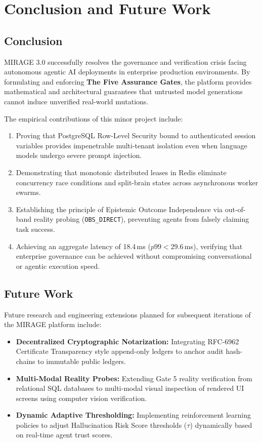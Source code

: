 \documentclass[12pt,a4paper]{report}
\numberwithin{equation}{section}
\begin{document}
\chapter{Conclusion and Future Work}

\section{Conclusion}
MIRAGE 3.0 successfully resolves the governance and verification crisis facing autonomous agentic AI deployments in enterprise production environments. By formulating and enforcing \textbf{The Five Assurance Gates}, the platform provides mathematical and architectural guarantees that untrusted model generations cannot induce unverified real-world mutations. 

The empirical contributions of this minor project include:
\begin{enumerate}
    \item Proving that PostgreSQL Row-Level Security bound to authenticated session variables provides impenetrable multi-tenant isolation even when language models undergo severe prompt injection.
    \item Demonstrating that monotonic distributed leases in Redis eliminate concurrency race conditions and split-brain states across asynchronous worker swarms.
    \item Establishing the principle of Epistemic Outcome Independence via out-of-band reality probing (\texttt{OBS\_DIRECT}), preventing agents from falsely claiming task success.
    \item Achieving an aggregate latency of 18.4\,ms ($p99 < 29.6$\,ms), verifying that enterprise governance can be achieved without compromising conversational or agentic execution speed.
\end{enumerate}

\section{Future Work}
Future research and engineering extensions planned for subsequent iterations of the MIRAGE platform include:
\begin{itemize}
    \item \textbf{Decentralized Cryptographic Notarization:} Integrating RFC-6962 Certificate Transparency style append-only ledgers to anchor audit hash-chains to immutable public ledgers.
    \item \textbf{Multi-Modal Reality Probes:} Extending Gate 5 reality verification from relational SQL databases to multi-modal visual inspection of rendered UI screens using computer vision verification.
    \item \textbf{Dynamic Adaptive Thresholding:} Implementing reinforcement learning policies to adjust Hallucination Risk Score thresholds ($\tau$) dynamically based on real-time agent trust scores.
\end{itemize}
\end{document}
